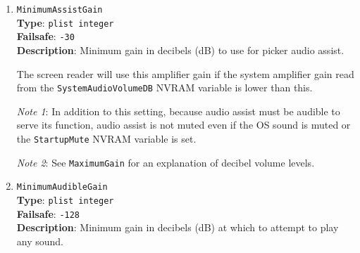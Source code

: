 \documentclass[]{article}
\begin{document}
\begin{enumerate}
  All UEFI audio will use this gain setting when the system amplifier gain read from the \texttt{SystemAudioVolumeDB}
  NVRAM variable is higher than this. This is to avoid over-loud UEFI audio when the system volume is set very high,
  or the \texttt{SystemAudioVolumeDB} NVRAM value has been misconfigured.

  \emph{Note 1}: Decibels (dB) specify gain (positive values; increase in volume) or attenuation (negative values; decrease
  in volume) compared to some reference level. When you hear the sound level of a jet plane expressed as 120 decibels, say,
  the reference level is the sound level just audible to an average human. However generally
  in acoustic science and computer audio any reference level can be specified. Intel HDA and macOS natively use
  decibels to specify volume level. On most Intel HDA hardware the reference level of 0 dB is the
  \emph{loudest} volume of the hardware, and all lower volumes are therefore negative numbers. The quietest volume
  on typical sound hardware is around -55 dB to -60 dB.

  \emph{Note 2}: Matching how macOS handles decibel values, this value is converted to a signed byte; therefore values
  outside $-128$ dB to $+127$ dB (which are well beyond physically plausible volume levels) are not allowed.

  \emph{Note 3}: Digital audio output -- which does not have a volume slider in-OS -- ignores this and all other gain settings,
  only mute settings are relevant.

\item
  \texttt{MinimumAssistGain}\\
  \textbf{Type}: \texttt{plist\ integer}\\
  \textbf{Failsafe}: \texttt{-30}\\
  \textbf{Description}: Minimum gain in decibels (dB) to use for picker audio assist.

  The screen reader will use this amplifier gain if the system amplifier gain read from the \texttt{SystemAudioVolumeDB}
  NVRAM variable is lower than this.

  \emph{Note 1}: In addition to this setting, because audio assist must be audible to serve its function, audio assist
  is not muted even if the OS sound is muted or the \texttt{StartupMute} NVRAM variable is set.

  \emph{Note 2}: See \texttt{MaximumGain} for an explanation of decibel volume levels.

\item
  \texttt{MinimumAudibleGain}\\
  \textbf{Type}: \texttt{plist\ integer}\\
  \textbf{Failsafe}: \texttt{-128}\\
  \textbf{Description}: Minimum gain in decibels (dB) at which to attempt to play any sound.


\end{enumerate}
\end{document}
